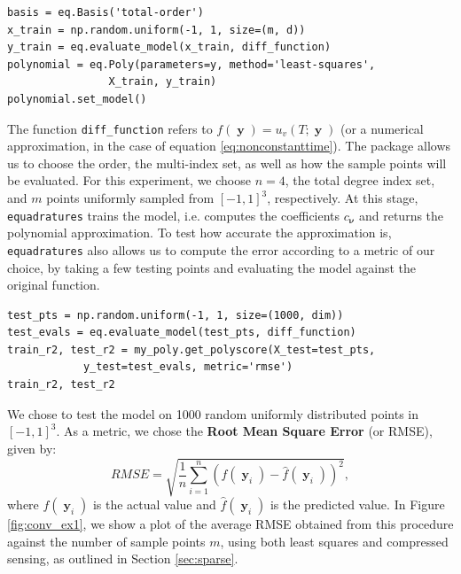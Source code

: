 \documentclass[12pt, oneside]{report}   	%
\DeclareMathOperator{\y}{\boldsymbol{y}}
\DeclareMathOperator{\nuu}{\boldsymbol{\nu}}
\begin{document}
\begin{tcolorbox}[colframe=white]
\begin{verbatim}
basis = eq.Basis('total-order')
x_train = np.random.uniform(-1, 1, size=(m, d))
y_train = eq.evaluate_model(x_train, diff_function)
polynomial = eq.Poly(parameters=y, method='least-squares', 
                X_train, y_train)
polynomial.set_model()
\end{verbatim}
\end{tcolorbox}
\smallskip

\noindent The function \texttt{diff\_function} refers to $f(\y)=u_v(T;\y)$ (or a numerical approximation, in the case of equation \eqref{eq:nonconstanttime}). The package allows us to choose the order, the multi-index set, as well as how the sample points will be evaluated. For this experiment, we choose $n=4$, the total degree index set, and $m$ points uniformly sampled from $[-1,1]^3$, respectively. At this stage, \texttt{equadratures} trains the model, i.e. computes the coefficients $c_{\nuu}$ and returns the polynomial approximation. To test how accurate the approximation is, \texttt{equadratures} also allows us to compute the error according to a metric of our choice, by taking a few testing points and evaluating the model against the original function.\\

\begin{tcolorbox}[colframe=white]
\begin{verbatim}
test_pts = np.random.uniform(-1, 1, size=(1000, dim))
test_evals = eq.evaluate_model(test_pts, diff_function)
train_r2, test_r2 = my_poly.get_polyscore(X_test=test_pts, 
            y_test=test_evals, metric='rmse')
train_r2, test_r2
\end{verbatim}
\end{tcolorbox}
\smallskip

\noindent We chose to test the model on 1000 random uniformly distributed points in $[-1,1]^3$. As a metric, we chose the \textbf{Root Mean Square Error} (or RMSE), given by:
$$
RMSE = \sqrt{\frac{1}{n} \sum_{i=1}^{n} (f(\y_i) - \hat{f}(\y_i))^2},
$$
where $f(\y_i)$ is the actual value and $\hat{f}(\y_i)$ is the predicted value. In Figure \ref{fig:conv_ex1}, we show a plot of the average RMSE obtained from this procedure against the number of sample points $m$, using both least squares and compressed sensing, as outlined in Section \ref{sec:sparse}.
\end{document}
